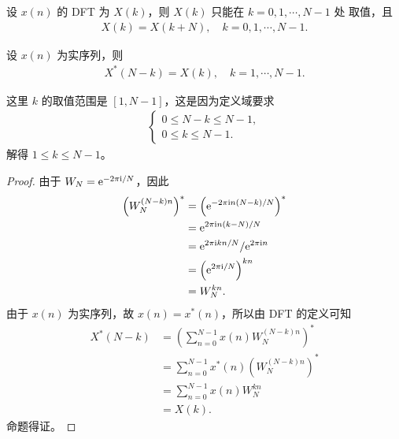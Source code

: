 \begin{property}
    设 $x(n)$ 的 DFT 为 $X(k)$，则 $X(k)$ 只能在 $k = 0, 1, \cdots, N - 1$ 处
    取值，且
    \begin{align*}
        X(k) = X(k + N), \quad k = 0, 1, \cdots, N - 1.
    \end{align*}
\end{property}

\begin{property}
    设 $x(n)$ 为实序列，则
    \begin{align*}
        X^*(N - k) = X(k), \quad k = 1, \cdots, N - 1.
    \end{align*}
\end{property}

\begin{note}
    这里 $k$ 的取值范围是 $[1, N-1]$，这是因为定义域要求
    \begin{align*}
        \begin{cases}
            0 \le N - k \le N - 1, \\
            0 \le k \le N - 1.
        \end{cases}
    \end{align*}
    解得 $1 \le k \le N - 1$。
\end{note}

\begin{proof}
    由于 $W_N = \mathrm{e}^{-2\pi\mathrm{i}/N}$，因此
    \begin{align*}
        \left(W_N^{(N - k)n}\right)^* & = \left(\mathrm{e}^{-2\pi\mathrm{i} n(N-k)/N}\right)^* \\
        & = \mathrm{e}^{2\pi\mathrm{i} n(k-N)/N} \\
        & = \mathrm{e}^{2\pi\mathrm{i} kn/N} / \mathrm{e}^{2\pi\mathrm{i} n} \\
        & = \left(\mathrm{e}^{2\pi\mathrm{i}/N}\right)^{kn} \\
        & = W_N^{kn}.
    \end{align*}
    由于 $x(n)$ 为实序列，故 $x(n) = x^*(n)$，所以由 DFT 的定义可知
    \begin{align*}
        X^*(N - k) & = \left(\sum_{n = 0}^{N - 1} x(n)W_N^{(N - k)n}\right)^* \\
        & = \sum_{n = 0}^{N - 1} x^*(n)\left(W_N^{(N - k)n}\right)^* \\
        & = \sum_{n = 0}^{N - 1} x(n)W_N^{kn} \\
        & = X(k).
    \end{align*}
    命题得证。
\end{proof}

